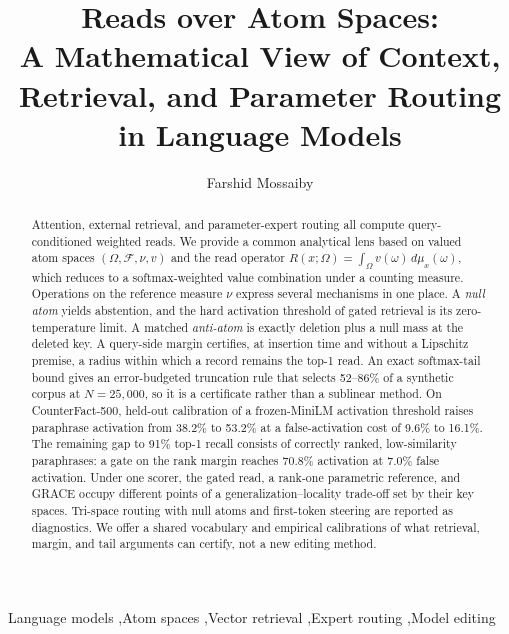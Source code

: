 \documentclass[preprint,12pt]{elsarticle}
\newcommand{\Om}{\Omega}
\newcommand{\rev}[1]{#1}
\begin{document}
\begin{frontmatter}

\title{Reads over Atom Spaces:\\
A Mathematical View of Context, Retrieval, and Parameter Routing in Language Models}

\author[inst1]{Farshid Mossaiby}

\begin{abstract}
Attention, external retrieval, and parameter-expert routing all compute query-conditioned weighted reads. We provide a common analytical lens based on valued atom spaces $(\Om,\mathcal F,\nu,v)$ and the read operator $R(x;\Om)=\int_\Om v(\omega)\,d\mu_x(\omega)$, which reduces to a softmax-weighted value combination under a counting measure. \rev{Operations on the reference measure $\nu$ express several mechanisms in one place. A \emph{null atom} yields abstention, and the hard activation threshold of gated retrieval is its zero-temperature limit. A matched \emph{anti-atom} is exactly deletion plus a null mass at the deleted key. A query-side margin certifies, at insertion time and without a Lipschitz premise, a radius within which a record remains the top-1 read.} An exact softmax-tail bound gives an error-budgeted truncation rule that selects 52--86\% of a synthetic corpus at $N=25{,}000$, so it is a certificate rather than a sublinear method. On CounterFact-500, held-out calibration of a frozen-MiniLM activation threshold raises paraphrase activation from 38.2\% to 53.2\% at a false-activation cost of 9.6\% to 16.1\%. \rev{The remaining gap to 91\% top-1 recall consists of correctly ranked, low-similarity paraphrases: a gate on the rank margin reaches 70.8\% activation at 7.0\% false activation. Under one scorer, the gated read, a rank-one parametric reference, and GRACE occupy different points of a generalization--locality trade-off set by their key spaces.} Tri-space routing with null atoms and first-token steering are reported as diagnostics. We offer a shared vocabulary and empirical calibrations of what retrieval, margin, and tail arguments can certify, not a new editing method.
\end{abstract}

\begin{keyword}
Language models \sep Atom spaces \sep Vector retrieval \sep Expert routing \sep Model editing
\end{keyword}

\end{frontmatter}
\end{document}
